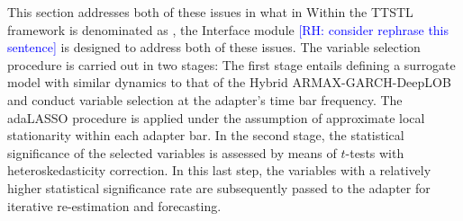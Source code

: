 \documentclass[10pt,a4paper,oneside]{article}
\newcommand{\rh}[1]{\textcolor{blue}{\textsf{[RH: #1]}}}
\providecommand{\DIFaddtex}[1]{{\protect\color{blue} \sf #1}} %
\providecommand{\DIFdeltex}[1]{{\protect\color{red} \scriptsize #1}} %
\providecommand{\DIFaddbegin}{} %
\providecommand{\DIFaddend}{} %
\providecommand{\DIFdelbegin}{} %
\providecommand{\DIFdelend}{} %
\providecommand{\DIFadd}[1]{\texorpdfstring{\DIFaddtex{#1}}{#1}} %
\providecommand{\DIFdel}[1]{\texorpdfstring{\DIFdeltex{#1}}{}} %
\newcommand{\DIFscaledelfig}{0.5}
\newlength{\DIFdelgraphicswidth} %
\newlength{\DIFdelgraphicsheight} %
\newcommand{\DIFaddincludegraphics}[2][]{{\color{blue}\fbox{\DIFOincludegraphics[#1]{#2}}}} %
\newcommand{\DIFdelincludegraphics}[2][]{%
\sbox{\DIFdelgraphicsbox}{\DIFOincludegraphics[#1]{#2}}%
\settoboxwidth{\DIFdelgraphicswidth}{\DIFdelgraphicsbox} %
\settoboxtotalheight{\DIFdelgraphicsheight}{\DIFdelgraphicsbox} %
\scalebox{\DIFscaledelfig}{%
\parbox[b]{\DIFdelgraphicswidth}{\usebox{\DIFdelgraphicsbox}\\[-\baselineskip] \rule{\DIFdelgraphicswidth}{0em}}\llap{\resizebox{\DIFdelgraphicswidth}{\DIFdelgraphicsheight}{%
\setlength{\unitlength}{\DIFdelgraphicswidth}%
\begin{picture}(1,1)%
\thicklines\linethickness{2pt} %
{\color[rgb]{1,0,0}\put(0,0){\framebox(1,1){}}}%
{\color[rgb]{1,0,0}\put(0,0){\line( 1,1){1}}}%
{\color[rgb]{1,0,0}\put(0,1){\line(1,-1){1}}}%
\end{picture}%
}\hspace*{3pt}}} %
} %
\DeclareRobustCommand{\DIFaddbegin}{\DIFOaddbegin \let\includegraphics\DIFaddincludegraphics} %
\DeclareRobustCommand{\DIFaddend}{\DIFOaddend \let\includegraphics\DIFOincludegraphics} %
\DeclareRobustCommand{\DIFdelbegin}{\DIFOdelbegin \let\includegraphics\DIFdelincludegraphics} %
\DeclareRobustCommand{\DIFdelend}{\DIFOaddend \let\includegraphics\DIFOincludegraphics} %
\begin{document}

\DIFdelbegin \DIFdel{This section addresses both of these issues in what in }\DIFdelend \DIFaddbegin \DIFadd{Within }\DIFaddend the TTSTL framework\DIFdelbegin \DIFdel{is denominated as }\DIFdelend \DIFaddbegin \DIFadd{, }\DIFaddend the Interface module \DIFdelbegin \DIFdel{\rh{consider rephrase this sentence}}\DIFdelend \DIFaddbegin \DIFadd{is designed to address both of these issues}\DIFaddend . The variable selection procedure is carried out in two stages: The first stage entails defining a surrogate model with similar dynamics to that of the Hybrid ARMAX-GARCH-DeepLOB and conduct variable selection at the adapter's time bar frequency. The adaLASSO procedure is applied under the assumption of approximate local stationarity within each adapter bar. In the second stage, the statistical significance of the selected variables is assessed by means of \(t\)-tests with heteroskedasticity correction. In this last step, the variables with a relatively higher statistical significance rate are subsequently passed to the adapter for iterative re-estimation and forecasting.
\medskip
\end{document}
